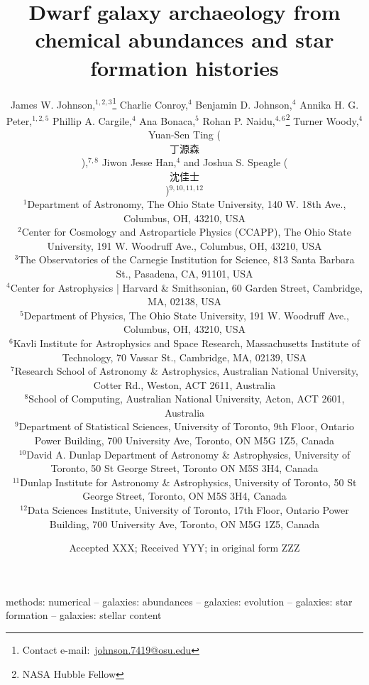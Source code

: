 \documentclass[fleqn, usenatbib]{mnras}
\title[Dwarf Galaxy Archaeology]{Dwarf galaxy archaeology from chemical
abundances and star formation histories}
\author[J.W. Johnson et al.]{James W. Johnson,$^{1, 2, 3}$\thanks{
	Contact e-mail:~\href{mailto:johnson.7419@osu.edu}{johnson.7419@osu.edu}}
	Charlie Conroy,$^{4}$
	Benjamin D. Johnson,$^{4}$
	Annika H. G. Peter,$^{1, 2, 5}$
	\newauthor
	Phillip A. Cargile,$^{4}$
	Ana Bonaca,$^{5}$
	Rohan P. Naidu,$^{4, 6}$\thanks{NASA Hubble Fellow}
	Turner Woody,$^{4}$
	Yuan-Sen Ting
	(\begin{CJK*}{UTF8}{gbsn}丁源森\ignorespacesafterend\end{CJK*}),$^{7, 8}$
	\newauthor
	Jiwon Jesse Han,$^{4}$
	and Joshua S. Speagle
	(\begin{CJK*}{UTF8}{gbsn}沈佳士\ignorespacesafterend\end{CJK*})$^{9, 10, 11,
	12}$
	\\
	$^{1}$Department of Astronomy, The Ohio State University,
	140 W. 18th Ave., Columbus, OH, 43210, USA
	\\
	$^{2}$Center for Cosmology and Astroparticle Physics (CCAPP),
	The Ohio State University, 191 W. Woodruff Ave., Columbus, OH, 43210, USA
	\\
	$^{3}$The Observatories of the Carnegie Institution for Science, 813 Santa
	Barbara St., Pasadena, CA, 91101, USA
	\\
	$^{4}$Center for Astrophysics | Harvard \& Smithsonian, 60 Garden Street,
	Cambridge, MA, 02138, USA
	\\
	$^{5}$Department of Physics, The Ohio State University, 191 W. Woodruff
	Ave., Columbus, OH, 43210, USA
	\\
	$^{6}$Kavli Institute for Astrophysics and Space Research, Massachusetts
	Institute of Technology, 70 Vassar St., Cambridge, MA, 02139, USA
	\\
	$^{7}$Research School of Astronomy \& Astrophysics, Australian National
	University, Cotter Rd., Weston, ACT 2611, Australia
	\\
	$^{8}$School of Computing, Australian National University, Acton, ACT
	2601, Australia
	\\
	$^{9}$Department of Statistical Sciences, University of Toronto, 9th Floor,
	Ontario Power Building, 700 University Ave, Toronto, ON M5G 1Z5, Canada
	\\
	$^{10}$David A. Dunlap Department of Astronomy \& Astrophysics, University
	of Toronto, 50 St George Street, Toronto ON M5S 3H4, Canada
	\\
	$^{11}$Dunlap Institute for Astronomy \& Astrophysics, University of
	Toronto, 50 St George Street, Toronto, ON M5S 3H4, Canada
	\\
	$^{12}$Data Sciences Institute, University of Toronto, 17th Floor, Ontario
	Power Building, 700 University Ave, Toronto, ON M5G 1Z5, Canada
}
\date{Accepted XXX; Received YYY; in original form ZZZ}
\begin{document}
\label{firstpage}
\pagerange{\pageref{firstpage}--\pageref{lastpage}}
\maketitle



\begin{keywords}
methods: numerical -- galaxies: abundances -- galaxies: evolution --
galaxies: star formation -- galaxies: stellar content
\end{keywords}













\begin{appendices}


\end{appendices}

\label{lastpage}
\end{document}
